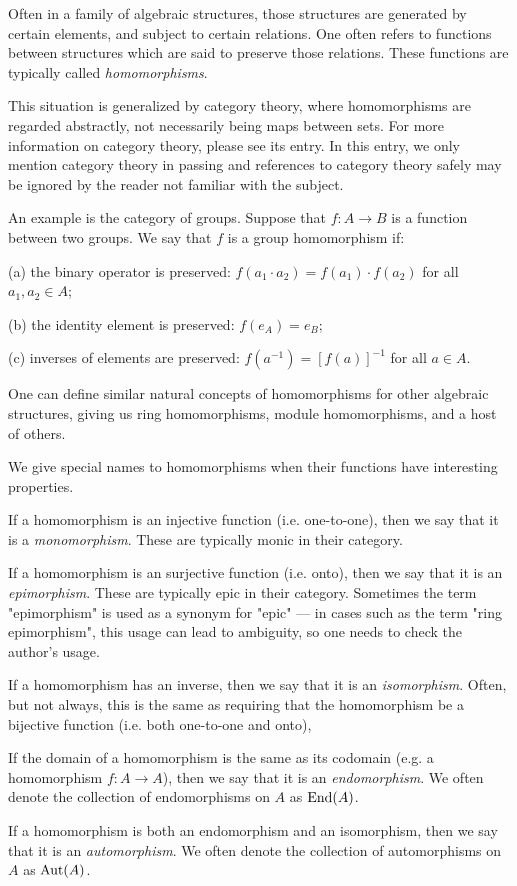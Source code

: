 \documentclass[12pt]{article}
\begin{document}
Often in a family of algebraic structures, 
those structures are generated by certain elements, 
and subject to certain relations.  
One often refers to functions between structures 
which are said to preserve those relations. 
These functions are typically called {\it homomorphisms}.

This situation is generalized by category theory, where
homomorphisms are regarded abstractly, not necessarily being
maps between sets.  For more information on category theory,
please see its entry.  In this entry, we only mention
category theory in passing and references to category
theory safely may be ignored by the reader not familiar with 
the subject.

An example is the category of groups.  
Suppose that $f:A \to B$ 
is a function between two groups.  
We say that $f$ is a group homomorphism if:

(a) the binary operator is preserved:
$f(a_1 \cdot a_2) = f(a_1) \cdot f(a_2)$ for all $a_1, a_2 \in A$;

(b) the identity element is preserved: 
$f(e_A) = e_B$;

(c) inverses of elements are preserved: 
$f(a^{-1}) = [f(a)]^{-1}$ for all $a \in A$.

One can define similar 
natural concepts of homomorphisms
for other algebraic structures,
giving us ring homomorphisms, 
module homomorphisms,
and a host of others.

We give special names to homomorphisms 
when their functions have interesting properties.

If a homomorphism is an injective function 
(i.e. one-to-one), 
then we say that it is a {\it monomorphism}.
These are typically monic in their category.

If a homomorphism is an surjective function 
(i.e. onto), 
then we say that it is an {\it epimorphism}.
These are typically epic in their category.
Sometimes the term "epimorphism" is used as
a synonym for "epic" --- in cases such as
the term "ring epimorphism", this usage can
lead to ambiguity, so one needs to check the
author's usage.

If a homomorphism has an inverse, 
then we say that it is an {\it isomorphism}.
Often, but not always, this is the same as
requiring that the homomorphism be a bijective function 
(i.e. both one-to-one and onto), 

If the domain of a homomorphism is the same as its codomain
(e.g. a homomorphism $f:A \to A$),
then we say that it is an {\it endomorphism}.
We often denote the collection of endomorphisms on $A$ as ${\rm End}(A)$.

If a homomorphism is both an endomorphism and an isomorphism,
then we say that it is an {\it automorphism}.
We often denote the collection of automorphisms on $A$ as ${\rm Aut}(A)$.
\end{document}
